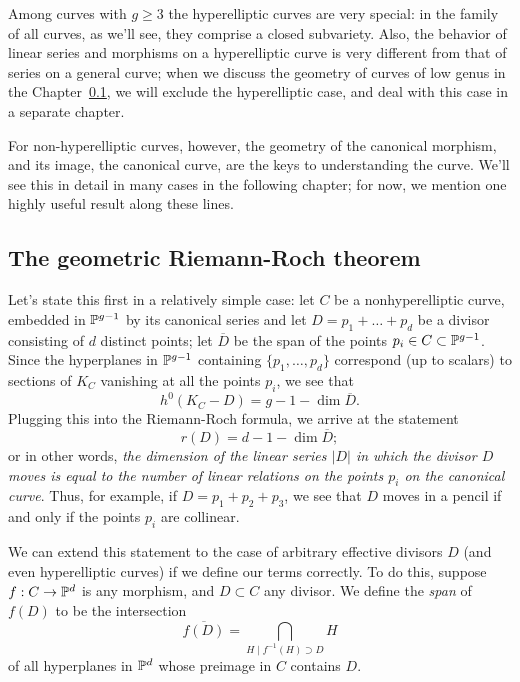Among curves with $g \geq 3$ the hyperelliptic curves are very special: in the family of all curves, as we'll see, they comprise a closed subvariety. Also, the behavior of linear series and morphisms on a hyperelliptic curve is very different from that of series on a general curve; when we discuss the geometry of curves of low genus in the Chapter~\ref{}, we will exclude  the hyperelliptic case, and deal with this case in a separate chapter.

For non-hyperelliptic curves, however, the geometry of the canonical morphism, and its image, the canonical curve, are the keys to understanding the curve. We'll see this in detail in many cases in the following chapter; for now, we mention one highly useful result along these lines.




\subsection{The geometric Riemann-Roch theorem}

Let's state this first in a relatively simple case: let $C$ be a nonhyperelliptic curve, embedded in ${\mathbb P}^{g-1}$ by its canonical series and let $D = p_1+\dots + p_d$ be a divisor consisting of $d$ distinct points; let $\overline D$ be the span of the points $p_i \in C \subset {\mathbb P}^{g-1}$. Since the hyperplanes in ${\mathbb P}^{g-1}$ containing $\{p_1,\dots,p_d\}$ correspond (up to scalars) to sections of $K_C$ vanishing at all the points $p_i$, we see that
$$
h^0(K_C-D) = g - 1 - \dim \overline D.
$$
Plugging this into the Riemann-Roch formula, we arrive at the statement
$$
r(D) = d - 1 - \dim \overline D;
$$
or in other words, \emph{the dimension of the linear series $|D|$ in which the divisor $D$ moves is equal to the number of linear relations on the points $p_i$ on the canonical curve}. Thus, for example, if $D = p_1+p_2+p_3$, we see that $D$ moves in a pencil if and only if the points $p_i$ are collinear.

We can extend this statement to the case of arbitrary effective divisors $D$ (and even hyperelliptic curves) if we define our terms correctly. To do this, suppose $f : C \to {\mathbb P}^d$ is any morphism, and $D \subset C$ any divisor. We define the \emph{span} of  $f(D)$ to be the intersection
$$
\overline{f(D)} = \bigcap_{H \mid f^{-1}(H)\supset D} H 
$$
of all hyperplanes in ${\mathbb P}^d$ whose preimage in $C$ contains $D$. 

